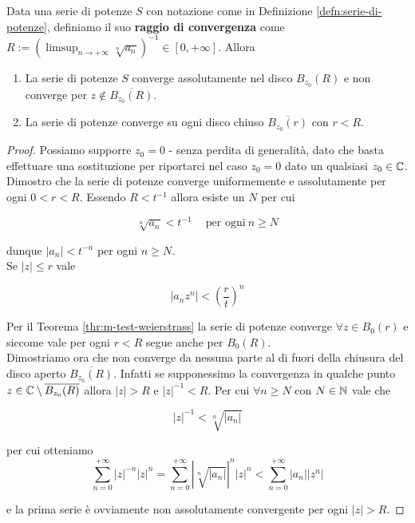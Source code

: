 \begin{theorem}
	\label{thr:criterio-hadamard}
	Data una serie di potenze $S$ con notazione come in Definizione \ref{defn:serie-di-potenze}, definiamo il suo \textbf{raggio di convergenza} come $R := ( \limsup_{n\to+\infty} \sqrt[n]{a_n})^{-1} \in \left[0,+\infty\right]$. Allora 
	\begin{enumerate}
		\item La serie di potenze $S$ converge assolutamente nel disco $B_{z_0}(R)$ e non converge per $z \notin \overline{B_{z_0}(R)}$.
		\item La serie di potenze converge su ogni disco chiuso $\overline{B_{z_0}(r)}$ con $r < R$.  
	\end{enumerate}
\end{theorem}
\begin{proof}
	Possiamo supporre $z_0 = 0$ - senza perdita di generalità, dato che basta effettuare una sostituzione per riportarci nel caso $z_0 = 0$ dato un qualsiasi $z_0 \in \mathbb{C}$.\\ 
	Dimostro che la serie di potenze converge uniformemente e assolutamente per ogni $0 < r < R$. Essendo $R < t^{-1}$ allora esiste un $N$ per cui
	
		\begin{equation*}
		\sqrt[n]{a_n} < t^{-1} \quad\ \text{per ogni}\ n \ge N 
		\end{equation*}
	
	dunque $|a_n| < t^{-n}$ per ogni $n \ge N$. \\ Se $|z| \le r$ vale
	
	\begin{equation*}
	|a_nz^n| < \left(\frac{r}{t}\right)^n
	\end{equation*}
	
	Per il Teorema \ref{thr:m-test-weierstrass} la serie di potenze converge $\forall z \in B_0(r)$ e siccome vale per ogni $r < R$ segue anche per $B_0(R)$.\\
	
	Dimostriamo ora che non converge da nessuna parte al di fuori della chiusura del disco aperto $\overline{B_{z_0}(R)}$. Infatti se supponessimo la convergenza in qualche punto $z \in \mathbb{C} \setminus \overline{B_{z_0}(R)}$ allora $|z| > R$ e $|z|^{-1} < R$. Per cui $\forall n \ge N$ con $N \in \mathbb{N}$ vale che
	
		\begin{equation*}
		|z|^{-1} < \sqrt[n]{|a_n|}
		\end{equation*}
		
	per cui otteniamo 
	\begin{equation*}	
	\sum^{+\infty}_{n=0}|z|^{-n}|z|^n = 	
		\sum^{+\infty}_{n=0}|\sqrt[n]{|a_n|}|^n|z|^n < 
		\sum^{+\infty}_{n=0}|a_n||z^n| 
	\end{equation*}
	
	e la prima serie è ovviamente non assolutamente convergente per ogni $|z| > R$.
\end{proof}

